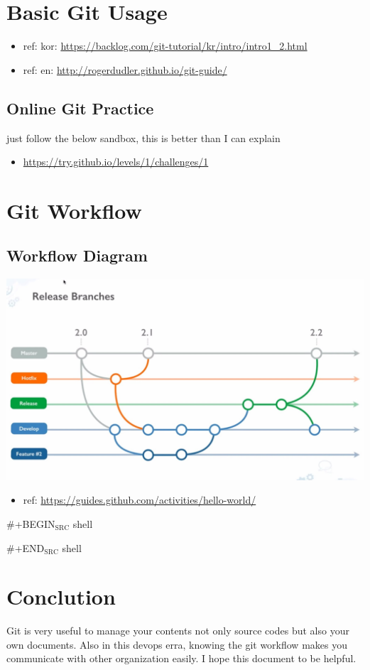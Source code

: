 \documentclass[bigger]{beamer}
\begin{document}
\section{Basic Git Usage}
\label{sec:orgheadline1}
\begin{itemize}
\item ref: kor: \url{https://backlog.com/git-tutorial/kr/intro/intro1_2.html}
\item ref: en: \url{http://rogerdudler.github.io/git-guide/}
\end{itemize}
\subsection{Online Git Practice}
\label{sec:orgheadline1}
just follow the below sandbox, this is better than I can explain
\begin{itemize}
\item \url{https://try.github.io/levels/1/challenges/1}
\end{itemize}


\section{Git Workflow}
\label{sec:orgheadline1}
\subsection{Workflow Diagram}
\label{sec:orgheadline1}
\includegraphics[width=.9\linewidth]{./git-workflow.jpg}

\begin{itemize}
\item ref: \url{https://guides.github.com/activities/hello-world/}
\end{itemize}

\#+BEGIN\(_{\text{SRC}}\) shell 

\#+END\(_{\text{SRC}}\) shell

\section{Conclution}
\label{sec:orgheadline1}
Git is very useful to manage your contents not only source codes but also your own documents. 
Also in this devops erra, knowing the git workflow makes you communicate with other organization easily.
I hope this document to be helpful.
\end{document}
